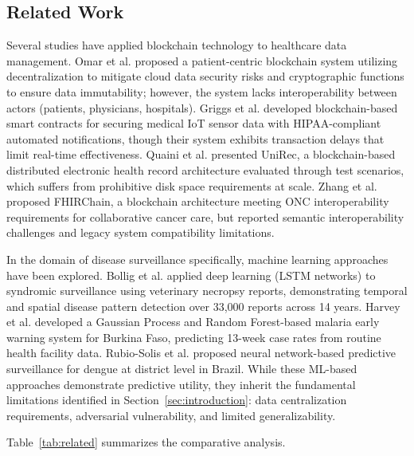 \documentclass[AMA,LATO1COL]{WileyNJD-v2}
\begin{document}
\subsection{Related Work}\label{subsec:related}

Several studies have applied blockchain technology to healthcare data management. Omar et al.\cite{omar2019privacy} proposed a patient-centric blockchain system utilizing decentralization to mitigate cloud data security risks and cryptographic functions to ensure data immutability; however, the system lacks interoperability between actors (patients, physicians, hospitals). Griggs et al.\cite{griggs2018healthcare} developed blockchain-based smart contracts for securing medical IoT sensor data with HIPAA-compliant automated notifications, though their system exhibits transaction delays that limit real-time effectiveness. Quaini et al.\cite{quaini2018model} presented UniRec, a blockchain-based distributed electronic health record architecture evaluated through test scenarios, which suffers from prohibitive disk space requirements at scale. Zhang et al.\cite{zhang2018fhirchain} proposed FHIRChain, a blockchain architecture meeting ONC interoperability requirements for collaborative cancer care, but reported semantic interoperability challenges and legacy system compatibility limitations.

In the domain of disease surveillance specifically, machine learning approaches have been explored. Bollig et al.\cite{bollig2020machine} applied deep learning (LSTM networks) to syndromic surveillance using veterinary necropsy reports, demonstrating temporal and spatial disease pattern detection over 33,000 reports across 14 years. Harvey et al.\cite{harvey2021predicting} developed a Gaussian Process and Random Forest-based malaria early warning system for Burkina Faso, predicting 13-week case rates from routine health facility data. Rubio-Solis et al.\cite{rubiosolis2019zika} proposed neural network-based predictive surveillance for dengue at district level in Brazil. While these ML-based approaches demonstrate predictive utility, they inherit the fundamental limitations identified in Section~\ref{sec:introduction}: data centralization requirements, adversarial vulnerability, and limited generalizability.

Table~\ref{tab:related} summarizes the comparative analysis.
\end{document}
